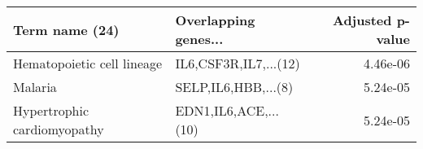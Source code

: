 \begin{tabular}{llr}
\toprule
             Term name (24) &  Overlapping genes... &  Adjusted p-value \\
\midrule
 Hematopoietic cell lineage & IL6,CSF3R,IL7,...(12) &          4.46e-06 \\
                    Malaria &   SELP,IL6,HBB,...(8) &          5.24e-05 \\
Hypertrophic cardiomyopathy &  EDN1,IL6,ACE,...(10) &          5.24e-05 \\
\bottomrule
\end{tabular}
